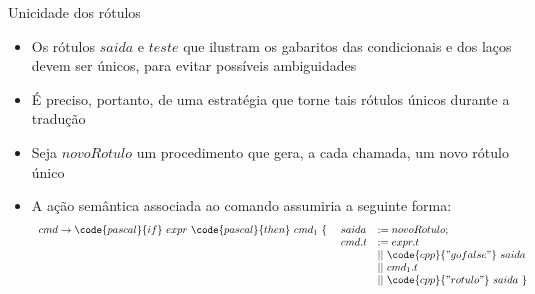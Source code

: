 \begin{frame}[fragile]{Unicidade dos rótulos}

    \begin{itemize}
        \item Os rótulos $saida$ e $teste$ que ilustram os gabaritos das condicionais e dos laços devem ser únicos, para evitar possíveis ambiguidades
        \pause

        \item É preciso, portanto, de uma estratégia que torne tais rótulos únicos durante a tradução
        \pause

        \item Seja $novoRotulo$ um procedimento que gera, a cada chamada, um novo rótulo único
        \pause

        \item A ação semântica associada ao comando  assumiria a seguinte forma:
        \[
            \begin{array}{rll}
            cmd \to \code{pascal}{if}\ expr\ \code{pascal}{then}\ cmd_1 \ \{\ & saida & := novoRotulo; \\
            & cmd.t & := expr.t\ \\ & & ||\ \code{cpp}{"gofalse"}\ saida\ \\ & & ||\ cmd_1.t \\
            & & ||\ \code{cpp}{"rotulo"}\ saida\ \}
            \end{array}
        \]
    \end{itemize}

\end{frame}
